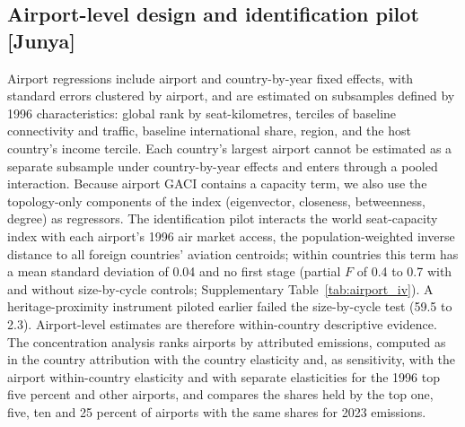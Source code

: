 \documentclass[12pt]{article}
\begin{document}
\subsection*{Airport-level design and identification pilot [Junya]}
Airport regressions include airport and country-by-year fixed effects, with
standard errors clustered by airport, and are estimated on subsamples
defined by 1996 characteristics: global rank by seat-kilometres, terciles
of baseline connectivity and traffic, baseline international share,
region, and the host country's income tercile. Each country's largest
airport cannot be estimated as a separate subsample under country-by-year
effects and enters through a pooled interaction. Because airport GACI
contains a capacity term, we also use the topology-only components of the
index (eigenvector, closeness, betweenness, degree) as regressors. The
identification pilot interacts the world seat-capacity index with each
airport's 1996 air market access, the population-weighted inverse distance
to all foreign countries' aviation centroids; within countries this term
has a mean standard deviation of 0.04 and no first stage (partial $F$ of
0.4 to 0.7 with and without size-by-cycle controls; Supplementary
Table~\ref{tab:airport_iv}). A heritage-proximity instrument piloted
earlier failed the size-by-cycle test (59.5 to 2.3). Airport-level
estimates are therefore within-country descriptive evidence. The
concentration analysis ranks airports by attributed emissions, computed as
in the country attribution with the country elasticity and, as
sensitivity, with the airport within-country elasticity and with separate
elasticities for the 1996 top five percent and other airports, and
compares the shares held by the top one, five, ten and 25 percent of
airports with the same shares for 2023 emissions.
\end{document}
